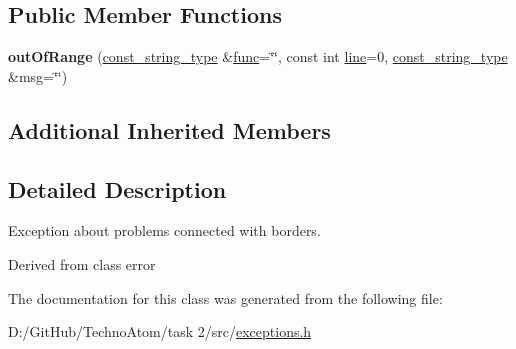 \subsection*{Public Member Functions}
\begin{DoxyCompactItemize}
\item 
\mbox{\label{classatom_1_1out_of_range_a388ec1d8924de5cfdc8b3bf06554fb3d}} 
{\bfseries out\+Of\+Range} (\hyperlink{classatom_1_1error_ac330e9fb7cedcf4a173c5eb156d7bdaf}{const\+\_\+string\+\_\+type} \&\hyperlink{classatom_1_1error_a0a70a92b1638bfe4be7972651ae0c5c8}{func}=\char`\"{}\char`\"{}, const int \hyperlink{classatom_1_1error_aa9443d1a458d0dc6086372444a58e8c6}{line}=0, \hyperlink{classatom_1_1error_ac330e9fb7cedcf4a173c5eb156d7bdaf}{const\+\_\+string\+\_\+type} \&msg=\char`\"{}\char`\"{})
\end{DoxyCompactItemize}
\subsection*{Additional Inherited Members}


\subsection{Detailed Description}
Exception about problems connected with borders. 

Derived from class error 

The documentation for this class was generated from the following file\+:\begin{DoxyCompactItemize}
\item 
D\+:/\+Git\+Hub/\+Techno\+Atom/task 2/src/\hyperlink{exceptions_8h}{exceptions.\+h}\end{DoxyCompactItemize}
